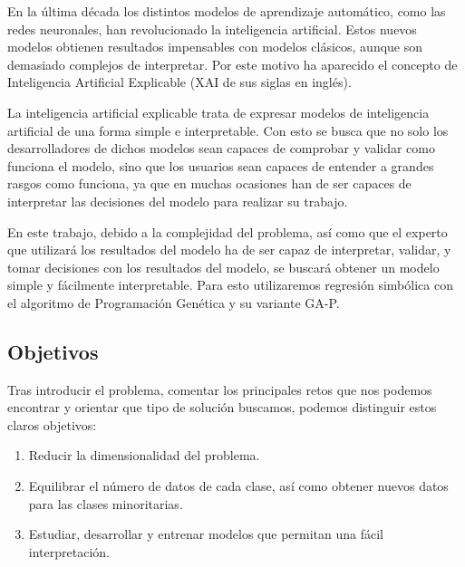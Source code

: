 En la última década los distintos modelos de aprendizaje automático, como las redes neuronales, han revolucionado la inteligencia artificial. Estos nuevos modelos obtienen resultados impensables con modelos clásicos, aunque son demasiado complejos de interpretar. Por este motivo ha aparecido el concepto de Inteligencia Artificial Explicable \cite{XAI} (XAI de sus siglas en inglés).

La inteligencia artificial explicable trata de expresar modelos de inteligencia artificial de una forma simple e interpretable. Con esto se busca que no solo los desarrolladores de dichos modelos sean capaces de comprobar y validar como funciona el modelo, sino que los usuarios sean capaces de entender a grandes rasgos como funciona, ya que en muchas ocasiones han de ser capaces de interpretar las decisiones del modelo para realizar su trabajo.

En este trabajo, debido a la complejidad del problema, así como que el experto que utilizará los resultados del modelo ha de ser capaz de interpretar, validar, y tomar decisiones con los resultados del modelo, se buscará obtener un modelo simple y fácilmente interpretable. Para esto utilizaremos regresión simbólica con el algoritmo de Programación Genética y su variante GA-P.


\subsection{Objetivos}

Tras introducir el problema, comentar los principales retos que nos podemos encontrar y orientar que tipo de solución buscamos, podemos distinguir estos claros objetivos:

\begin{enumerate}
	\item Reducir la dimensionalidad del problema.
	\item Equilibrar el número de datos de cada clase, así como obtener nuevos datos para las clases minoritarias.
	\item Estudiar, desarrollar y entrenar modelos que permitan una fácil interpretación.
\end{enumerate}


\newpage
